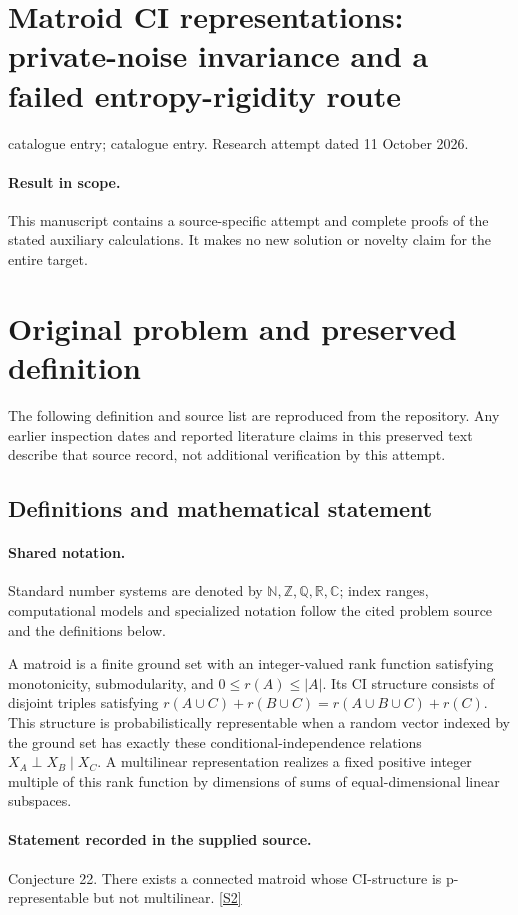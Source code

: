 \documentclass[11pt]{article}
\begin{document}
\section*{Matroid CI representations: private-noise invariance and a failed entropy-rigidity route}
\noindent catalogue entry; catalogue entry. Research attempt dated 11 October 2026.
\paragraph{Result in scope.}This manuscript contains a source-specific attempt and complete proofs of the stated auxiliary calculations. It makes no new solution or novelty claim for the entire target.
\section{Original problem and preserved definition}
The following definition and source list are reproduced from the repository. Any earlier inspection dates and reported literature claims in this preserved text describe that source record, not additional verification by this attempt.
\subsection{Definitions and mathematical statement}

\paragraph{Shared notation.}Standard number systems are denoted by $\mathbb N,\mathbb Z,\mathbb Q,\mathbb R,\mathbb C$; index ranges, computational models and specialized notation follow the cited problem source and the definitions below.


A matroid is a finite ground set with an integer-valued rank function satisfying monotonicity, submodularity, and $0\le r(A)\le |A|$. Its CI structure consists of disjoint triples satisfying $r(A\cup C)+r(B\cup C)=r(A\cup B\cup C)+r(C)$. This structure is probabilistically representable when a random vector indexed by the ground set has exactly these conditional-independence relations $X_A\perp X_B\mid X_C$. A multilinear representation realizes a fixed positive integer multiple of this rank function by dimensions of sums of equal-dimensional linear subspaces.
\paragraph{Statement recorded in the supplied source.}
Conjecture 22. There exists a connected matroid whose CI-structure is p-representable but not multilinear. \href{https://aimath.org/WWN/compalgstat/compalgstat.pdf}{[S2]}
\end{document}
